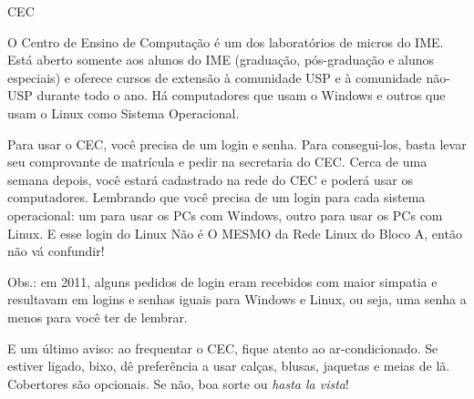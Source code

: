 \begin{secao}{CEC}

O Centro de Ensino de Computação é um dos laboratórios de micros do IME. Está aberto somente aos alunos do IME (graduação, pós-graduação e alunos especiais) e oferece cursos de extensão à comunidade USP e à comunidade não-USP durante todo o ano. Há computadores que usam o Windows e outros que usam o Linux como Sistema Operacional.

Para usar o CEC, você precisa de um login e senha. Para consegui-los, basta levar seu comprovante de matrícula e pedir na secretaria do CEC. Cerca de uma semana depois, você estará cadastrado na rede do CEC e poderá usar os computadores. Lembrando que você precisa de um login para cada sistema operacional: um para usar os PCs com Windows, outro para usar os PCs com Linux. E esse login do Linux Não é O MESMO da Rede Linux do Bloco A, então não vá confundir!

Obs.: em 2011, alguns pedidos de login eram recebidos com maior simpatia e resultavam em logins e senhas iguais para Windows e Linux, ou seja, uma senha a menos para você ter de lembrar. 

E um último aviso: ao frequentar o CEC, fique atento ao ar-condicionado. Se estiver ligado, bixo, dê preferência a usar calças, blusas, jaquetas e meias de lã. Cobertores são opcionais. Se não, boa sorte ou \textit{hasta la vista}! 

\end{secao}
